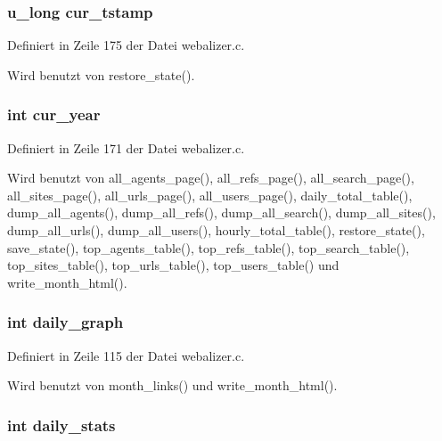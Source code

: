 \subsubsection{\setlength{\rightskip}{0pt plus 5cm}u\_\-long {\bf cur\_\-tstamp}}\label{webalizer_8h_4327980462d3207e34bf99fce007b511}




Definiert in Zeile 175 der Datei webalizer.c.

Wird benutzt von restore\_\-state().
\subsubsection{\setlength{\rightskip}{0pt plus 5cm}int {\bf cur\_\-year}}\label{webalizer_8h_8447667f9dc8021c4f17284b9a12f776}




Definiert in Zeile 171 der Datei webalizer.c.

Wird benutzt von all\_\-agents\_\-page(), all\_\-refs\_\-page(), all\_\-search\_\-page(), all\_\-sites\_\-page(), all\_\-urls\_\-page(), all\_\-users\_\-page(), daily\_\-total\_\-table(), dump\_\-all\_\-agents(), dump\_\-all\_\-refs(), dump\_\-all\_\-search(), dump\_\-all\_\-sites(), dump\_\-all\_\-urls(), dump\_\-all\_\-users(), hourly\_\-total\_\-table(), restore\_\-state(), save\_\-state(), top\_\-agents\_\-table(), top\_\-refs\_\-table(), top\_\-search\_\-table(), top\_\-sites\_\-table(), top\_\-urls\_\-table(), top\_\-users\_\-table() und write\_\-month\_\-html().
\subsubsection{\setlength{\rightskip}{0pt plus 5cm}int {\bf daily\_\-graph}}\label{webalizer_8h_81ebc74fab71c6cde9eff752ad0b5974}




Definiert in Zeile 115 der Datei webalizer.c.

Wird benutzt von month\_\-links() und write\_\-month\_\-html().
\subsubsection{\setlength{\rightskip}{0pt plus 5cm}int {\bf daily\_\-stats}}\label{webalizer_8h_4c83c5bd481ef466be0d92fd9ad6c8b1}




